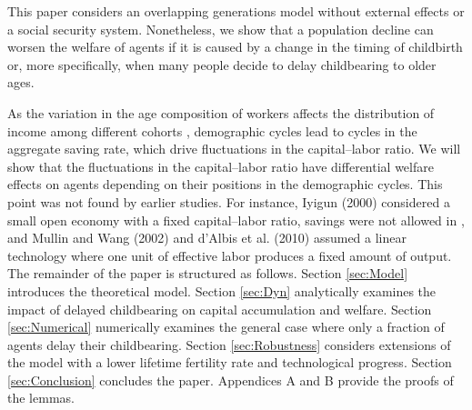 \documentclass{MBE}%
\begin{document}
{This paper considers an overlapping generations model without external effects
or a social security system. Nonetheless, we show that a population decline
can worsen the welfare of agents if it is caused by a change in the timing of
childbirth or, more specifically, when many people decide to delay
childbearing to older ages.


 As the variation in the age composition of workers affects
the distribution of income among different cohorts \citep{Posada_Crandall:1998}, demographic
cycles lead to cycles in the aggregate saving rate, which drive fluctuations in the capital--labor
ratio. We will show that the fluctuations in the capital--labor ratio have differential welfare
effects on agents depending on their positions in the demographic cycles. This point was not found
by earlier studies. For instance, Iyigun (2000) considered a small open economy with a fixed
capital--labor ratio, savings were not allowed in \citep{Posada_Crandall:1998}, and Mullin and
Wang (2002) and d'Albis et al. (2010) assumed a linear technology where one unit of effective
labor produces a fixed amount of output. The remainder of the paper is structured as follows.
Section \ref{sec:Model} introduces the theoretical model. Section \ref{sec:Dyn} analytically
examines the impact of delayed childbearing on capital accumulation and welfare. Section
\ref{sec:Numerical} numerically examines the general case where only a fraction of agents delay
their childbearing. Section \ref{sec:Robustness} considers extensions of the model with a lower
lifetime fertility rate and technological progress. Section \ref{sec:Conclusion} concludes the
paper. Appendices A and B provide the proofs of the lemmas.

}
\end{document}

